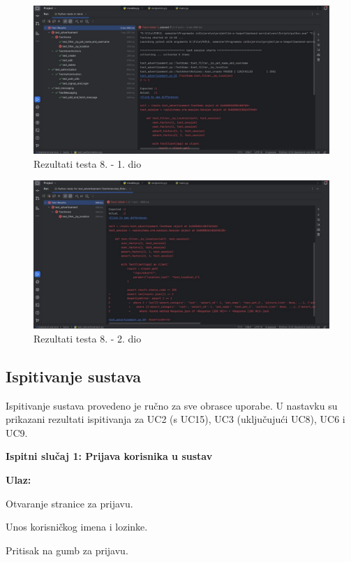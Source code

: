 			\begin{figure}[H]
			 	\includegraphics[scale=0.42]{slike/test8a.jpg} %
			 	\centering
			 	\caption{Rezultati testa 8. - 1. dio}
			 	\label{fig:test8a}
			 \end{figure}

			\begin{figure}[H]
			 	\includegraphics[scale=0.42]{slike/test8b.jpg} %
			 	\centering
			 	\caption{Rezultati testa 8. - 2. dio}
			 	\label{fig:test8b}
			 \end{figure}
			
			\subsection{Ispitivanje sustava}
			
			Ispitivanje sustava provedeno je ručno za sve obrasce uporabe. U nastavku su prikazani rezultati ispitivanja za UC2 (s UC15), UC3 (uključujući UC8), UC6 i UC9.

			\noindent \textbf{Ispitni  slučaj 1: Prijava korisnika u sustav}

			\noindent \textbf{Ulaz: }
			\begin{packed_enum}
				\item Otvaranje stranice za prijavu.
				\item Unos korisničkog imena i lozinke.
				\item Pritisak na gumb za prijavu.
			\end{packed_enum}

